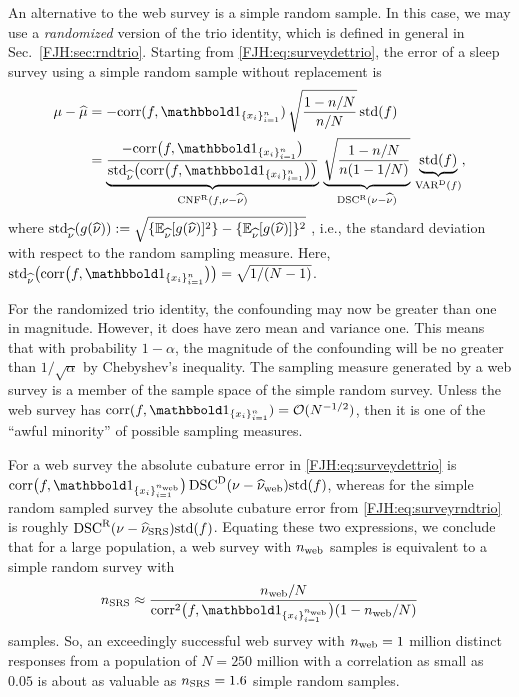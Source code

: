 \documentclass[graybox,footinfo]{svmult}
\DeclareMathOperator{\algn}{CNF}
\DeclareMathOperator{\disc}{DSC}
\DeclareMathOperator{\Var}{VAR}
\begin{document}
An alternative to the web survey is a simple random sample.  In this 
case, we may use a 
\emph{randomized} version of the trio identity, which is defined in general in Sec.\  
\ref{FJH:sec:rndtrio}.  Starting 
from \eqref{FJH:eq:surveydettrio}, the 
error of a sleep survey using a simple random sample without replacement is
\begin{align}
\nonumber
\mu - \widehat{\mu} 
& = -\corr(f, \bbone_{\{x_i\}_{i=1}^n}) \,
\sqrt{\frac{1 - n/N}{n/N}} \, 
\std(f) \\
& = \underbrace{\frac{- \corr\bigl(f, \bbone_{\{x_i\}_{i=1}^n}\bigr)}
{\std_{\hnu} \bigl( \corr\bigl(f, \bbone_{\{x_i\}_{i=1}^n}\bigr)\bigr)}}_{\algn^\Rn(f,\nu - \hnu)} 
\, 
\underbrace{\sqrt{\frac{1-n/N}{n(1-1/N)}}}_{\disc^\Rn(\nu - \hnu)} \, 
\underbrace{\std(f)}_{\Var^\Dt(f)},
\label{FJH:eq:surveyrndtrio}
\end{align}
where $\textup{std}_{\widehat{\nu}}(g(\widehat{\nu})) := \sqrt{\{{\mathbb{E}}_{\widehat{\nu}}[g(\widehat{\nu})]^2 \}- 
\{{\mathbb{E}}_{\widehat{\nu}}[g(\widehat{\nu})]\}^2}$ , 
i.e., 
the standard deviation with 
respect to the random sampling 
measure.  Here, $\std_{\hnu} \bigl( \corr\bigl(f, 
\bbone_{\{x_i\}_{i=1}^n}\bigr)\bigr) = \sqrt{1/(N-1)}$.

For the randomized trio identity, the confounding may now be greater than one in 
magnitude.  However, it  does have zero mean and 
variance one.  This means that with probability $1-\alpha$, the magnitude of 
the confounding will be no greater than $1/\sqrt{\alpha}$ by Chebyshev's inequality. The 
sampling measure generated by a web survey is a member of the sample space of the 
simple random survey.  Unless the 
web survey has $\corr(f, \bbone_{\{x_i\}_{i=1}^n}) = \calO(N^{-1/2})$, then it is one of 
the ``awful minority'' of possible sampling measures.

For a web survey the absolute cubature error in \eqref{FJH:eq:surveydettrio} is 
$\corr\bigl(f, 
\bbone_{\{x_i\}_{i=1}^{n_{\textup{web}}}}\bigr) \disc^\Dt(\nu - \hnu_{\textup{web}}) \std(f)$, 
whereas for the simple random sampled survey the absolute cubature error from 
\eqref{FJH:eq:surveyrndtrio} is roughly $\disc^\Rn(\nu - \hnu_{\textup{SRS}}) \std(f)$.  
Equating these two expressions, we conclude that for a large population, a web survey with 
$n_{\textup{web}}$ samples is equivalent to a simple random survey with 
\[
n_{\textup{SRS}} \approx \frac{n_{\textup{web}}/N}{\corr^2\bigl(f, 
\bbone_{\{x_i\}_{i=1}^{n_{\textup{web}}}}\bigr)(1-n_{\textup{web}}/N)}
\]
samples.  So, an exceedingly successful web survey with $n_{\textup{web}} = 
1$ million distinct responses from a population of $N = 250$ million with a correlation as 
small as $0.05$ is about as 
valuable as $n_{\textup{SRS}} = 1.6$ simple random samples.
\end{document}
